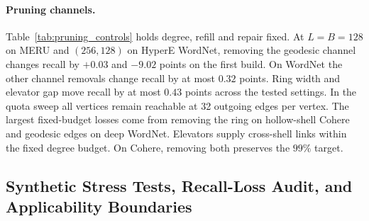 \paragraph{Pruning channels.}
Table~\ref{tab:pruning_controls} holds degree, refill and repair fixed. At $L=B=128$ on MERU and $(256,128)$ on HyperE WordNet, removing the geodesic channel changes recall by $+0.03$ and $-9.02$ points on the first build. On WordNet the other channel removals change recall by at most $0.32$ points. Ring width and elevator gap move recall by at most $0.43$ points across the tested settings. In the quota sweep all vertices remain reachable at 32 outgoing edges per vertex. The largest fixed-budget losses come from removing the ring on hollow-shell Cohere and geodesic edges on deep WordNet. Elevators supply cross-shell links within the fixed degree budget. On Cohere, removing both preserves the $99\%$ target.



\subsection{Synthetic Stress Tests, Recall-Loss Audit, and Applicability Boundaries}
\label{subsec:eval_synthetic}

